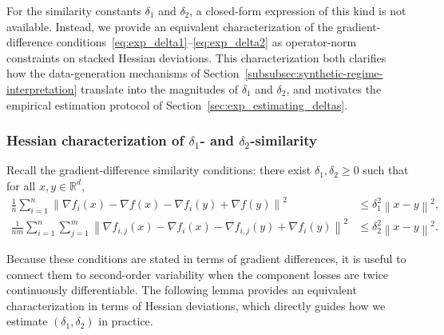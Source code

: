 \documentclass{article}
\newcommand{\bb}{\mathbb}
\newcommand{\R}{\bb R}
\newcommand{\sqn}[1]{\left\| #1 \right\|^2}
\theoremstyle{plain}
\begin{document}
For the similarity constants $\delta_1$ and $\delta_2$, a closed-form expression of this kind is not available. Instead, we provide an equivalent characterization of the gradient-difference conditions~\eqref{eq:exp_delta1}--\eqref{eq:exp_delta2} as operator-norm constraints on stacked Hessian deviations. This characterization both clarifies how the data-generation mechanisms of Section~\ref{subsubsec:synthetic-regime-interpretation} translate into the magnitudes of $\delta_1$ and $\delta_2$, and motivates the empirical estimation protocol of Section~\ref{sec:exp_estimating_deltas}.

\subsubsection{Hessian characterization of $\delta_1$- and $\delta_2$-similarity}
\label{sec:exp_similarity_hessian}

Recall the gradient-difference similarity conditions: there exist $\delta_1,\delta_2\ge 0$ such that for all $x,y\in\R^d$,
\begin{align}
\label{eq:exp_delta1}
\frac{1}{n}\sum_{i=1}^n \sqn{\nabla f_i(x)-\nabla f(x)-\nabla f_i(y)+\nabla f(y)} &\le \delta_1^2\sqn{x-y}, \\
\label{eq:exp_delta2}
\frac{1}{nm}\sum_{i=1}^n\sum_{j=1}^m \sqn{\nabla f_{i,j}(x)-\nabla f_i(x)-\nabla f_{i,j}(y)+\nabla f_i(y)} &\le \delta_2^2\sqn{x-y}.
\end{align}

Because these conditions are stated in terms of gradient differences, it is useful to connect them to second-order variability when the component losses are twice continuously differentiable. The following lemma provides an equivalent characterization in terms of Hessian deviations, which directly guides how we estimate $(\delta_1,\delta_2)$ in practice.
\end{document}
